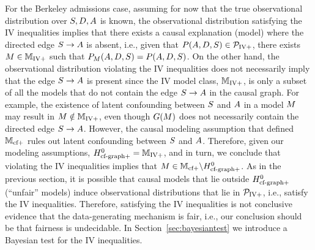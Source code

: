 For the Berkeley admissions case, assuming for now that the true observational distribution over $S,D,A$ is known, the observational distribution satisfying the IV inequalities implies that there exists a causal explanation (model) where the directed edge $S \rightarrow A$ is absent, i.e., given that $P(A,D, S) \in {\cal P}_{\text{IV}+}$, there exists $M \in \mathbb{M}_{\text{IV}+}$ such that $P_{M}(A,D,S) = P(A,D,S)$. On the other hand, the observational distribution violating the IV inequalities does not necessarily imply that the edge $S \rightarrow A$ is present since the IV model class, $\mathbb{M}_{\text{IV}+}$, is only a subset of all the models that do not contain the edge $S \rightarrow A$ in the causal graph. For example, the existence of latent confounding between $S$ and $A$ in a model $M$ may result in $M \notin \mathbb{M}_{\text{IV}+}$, even though $G{\left({M}\right)}$ does not necessarily contain the directed edge $S \rightarrow A$. However, the causal modeling assumption that defined $\mathbb{M}_{\text{cf}+}$ rules out latent confounding between $S$ and $A$. Therefore, given our modeling assumptions, $H^0_{\text{cf-graph}+} = \mathbb{M}_{\text{IV}+}$, and in turn, we conclude that violating the IV inequalities implies that $M \in \mathbb{M}_{\text{cf}+} \backslash H^0_{\text{cf-graph}+}$. As in the previous section, it is possible that causal models that lie outside $H^0_{\text{cf-graph}+}$  (``unfair'' models) induce observational distributions that lie in ${\cal P}_{\text{IV}+}$, i.e., satisfy the IV inequalities. Therefore, satisfying the IV inequalities is not conclusive evidence that the data-generating mechanism is fair, i.e., our conclusion should be that fairness is undecidable. In Section~\ref{sec:bayesiantest} we introduce a Bayesian test for the IV inequalities.


